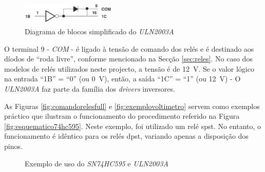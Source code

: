 \begin{figure}[hbtp]
	\centering
	\includegraphics[width=0.4\textwidth]{figures/uln2003_diagramablocos.png}
	\caption{Diagrama de blocos simplificado do \textit{ULN2003A}}
	\label{fig:diagramablocos2003}
\end{figure}

O terminal 9 - \textit{COM} - é ligado à tensão de comando dos relés e é destinado aos díodos de ``roda livre'', conforme mencionado na Secção \ref{sec:reles}. No caso dos modelos de relés utilizados neste projecto, a tensão é de \SI{12}{\volt}. Se o valor lógico na entrada ``1B'' = ``0'' (ou \SI{0}{\volt}), então, a saída ``1C'' = ``1'' (ou \SI{12}{\volt}) - 
O \textit{ULN2003A} faz parte da família dos \textit{drivers} inversores.

As Figuras \ref{fig:comandorelesfull} e \ref{fig:exemplovoltimetro} servem como exemplos práctico que ilustram o funcionamento do procedimento referido na Figura \ref{fig:esquematico74hc595}. Neste exemplo, foi utilizado um relé \acrshort{spst}. No entanto, o funcionamento é idêntico para os relés \acrshort{dpst}, variando apenas a disposição dos pinos.

\begin{figure}[hbtp]
	\centering%
		\centering
		\qquad
		\caption{Exemplo de uso do \textit{SN74HC595} e \textit{ULN2003A}}%
		\label{fig:ligacao5952003}%
	\end{figure}


